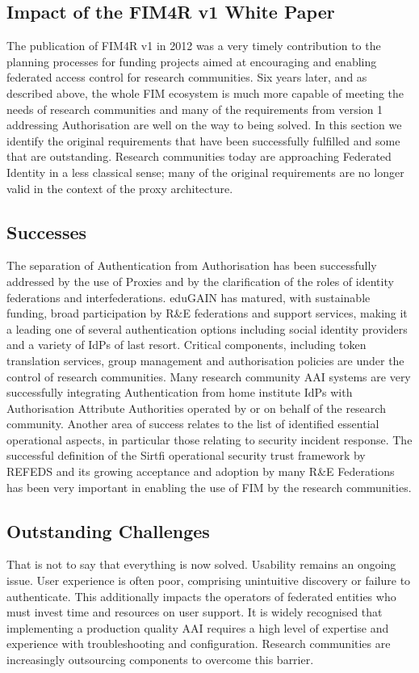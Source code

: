 \documentclass[fleqn,10pt]{wlscirep}
\begin{document}
{\subsection{Impact of the FIM4R v1 White Paper}
The publication of FIM4R v1 in 2012 was a very timely contribution to the planning processes for funding projects aimed at encouraging and enabling federated access control for research communities. Six years later, and as described above, the whole FIM ecosystem is much more capable of meeting the needs of research communities and many of the requirements from version 1 addressing Authorisation are well on the way to being solved. In this section we identify the original requirements that have been successfully fulfilled and some that are outstanding. Research communities today are approaching Federated Identity in a less classical sense; many of the original requirements are no longer valid in the context of the proxy architecture.

\subsection{Successes} 
The separation of Authentication from Authorisation has been successfully addressed by the use of Proxies and by the clarification of the roles of identity federations and interfederations. eduGAIN has matured, with sustainable funding, broad participation by R\&E federations and support services, making it a leading one of several authentication options including social identity providers and a variety of IdPs of last resort. Critical components, including token translation services, group management and authorisation policies are under the control of research communities. Many research community AAI systems are very successfully integrating Authentication from home institute IdPs with Authorisation Attribute Authorities operated by or on behalf of the research community. Another area of success relates to the list of identified essential operational aspects, in particular those relating to security incident response. The successful definition of the Sirtfi operational security trust framework by REFEDS and its growing acceptance and adoption by many R\&E Federations has been very important in enabling the use of FIM by the research communities.

\subsection{Outstanding Challenges}
That is not to say that everything is now solved. Usability remains an ongoing issue. User experience is often poor, comprising unintuitive discovery or failure to authenticate. This additionally impacts the operators of federated entities who must invest time and resources on user support. It is widely recognised that implementing a production quality AAI requires a high level of expertise and experience with troubleshooting and configuration. Research communities are increasingly outsourcing components to overcome this barrier.

}
\end{document}
